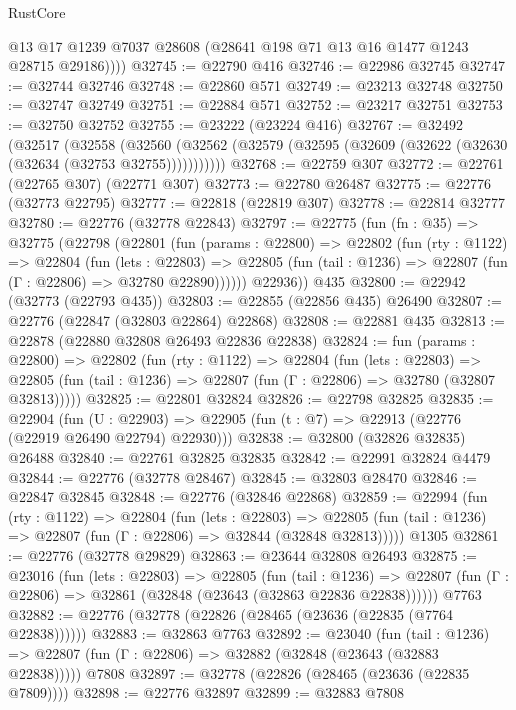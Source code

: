 \begin{lexlean}{RustCore}
\begin{coremodule}
          @13
          @17
          @1239
          @7037
          @28608
          (@28641 @198 @71 @13 @16 @1477 @1243 @28715 @29186))))
@32745 := @22790 @416
@32746 := @22986 @32745
@32747 := @32744 @32746
@32748 := @22860 @571
@32749 := @23213 @32748
@32750 := @32747 @32749
@32751 := @22884 @571
@32752 := @23217 @32751
@32753 := @32750 @32752
@32755 := @23222 (@23224 @416)
@32767 := @32492
    (@32517
      (@32558
        (@32560 (@32562 (@32579 (@32595 (@32609 (@32622 (@32630 (@32634 (@32753 @32755)))))))))))
@32768 := @22759 @307
@32772 := @22761 (@22765 @307) (@22771 @307)
@32773 := @22780 @26487
@32775 := @22776 (@32773 @22795)
@32777 := @22818 (@22819 @307)
@32778 := @22814 @32777
@32780 := @22776 (@32778 @22843)
@32797 := @22775
    (fun (fn : @35) =>
    @32775
      (@22798
        (@22801
          (fun (params : @22800) =>
          @22802
            (fun (rty : @1122) =>
            @22804
              (fun (lets : @22803) =>
              @22805 (fun (tail : @1236) => @22807 (fun (Γ : @22806) => @32780 @22890))))))
        @22936))
    @435
@32800 := @22942 (@32773 (@22793 @435))
@32803 := @22855 (@22856 @435) @26490
@32807 := @22776 (@22847 (@32803 @22864) @22868)
@32808 := @22881 @435
@32813 := @22878 (@22880 @32808 @26493 @22836 @22838)
@32824 := fun (params : @22800) =>
  @22802
    (fun (rty : @1122) =>
    @22804
      (fun (lets : @22803) =>
      @22805 (fun (tail : @1236) => @22807 (fun (Γ : @22806) => @32780 (@32807 @32813)))))
@32825 := @22801 @32824
@32826 := @22798 @32825
@32835 := @22904
    (fun (U : @22903) => @22905 (fun (t : @7) => @22913 (@22776 (@22919 @26490 @22794) @22930)))
@32838 := @32800 (@32826 @32835) @26488
@32840 := @22761 @32825 @32835
@32842 := @22991 @32824 @4479
@32844 := @22776 (@32778 @28467)
@32845 := @32803 @28470
@32846 := @22847 @32845
@32848 := @22776 (@32846 @22868)
@32859 := @22994
    (fun (rty : @1122) =>
    @22804
      (fun (lets : @22803) =>
      @22805 (fun (tail : @1236) => @22807 (fun (Γ : @22806) => @32844 (@32848 @32813)))))
    @1305
@32861 := @22776 (@32778 @29829)
@32863 := @23644 @32808 @26493
@32875 := @23016
    (fun (lets : @22803) =>
    @22805
      (fun (tail : @1236) =>
      @22807 (fun (Γ : @22806) => @32861 (@32848 (@23643 (@32863 @22836 @22838))))))
    @7763
@32882 := @22776 (@32778 (@22826 (@28465 (@23636 (@22835 (@7764 @22838))))))
@32883 := @32863 @7763
@32892 := @23040
    (fun (tail : @1236) => @22807 (fun (Γ : @22806) => @32882 (@32848 (@23643 (@32883 @22838)))))
    @7808
@32897 := @32778 (@22826 (@28465 (@23636 (@22835 @7809))))
@32898 := @22776 @32897
@32899 := @32883 @7808

\end{coremodule}
\end{lexlean}
